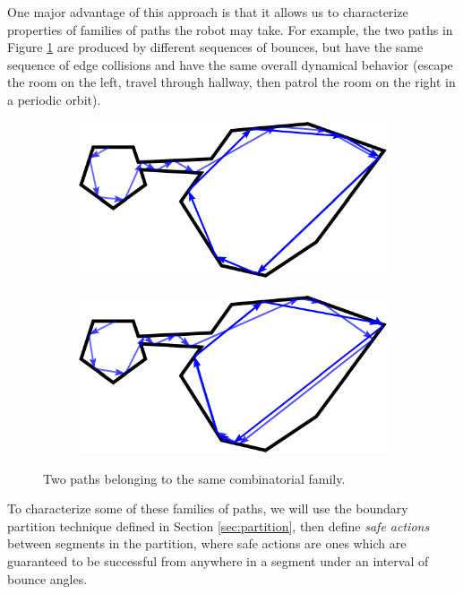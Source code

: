 \documentclass[]{styles/svproc}  %
\begin{document}
One major advantage of this approach is that it allows us to characterize
properties of families of paths the robot may take. For example, the  
two paths in Figure \ref{fig:twopaths} are produced by different sequences of
bounces, but have the same sequence of edge collisions and have the same overall
dynamical behavior (escape the room on the left, travel through hallway, then
patrol the room on the right in a periodic orbit).

\begin{figure}
\centering
\begin{subfigure}{0.5\textwidth}
\includegraphics[width=\linewidth]{figures/twoc_a}
\end{subfigure}%
\begin{subfigure}{0.5\textwidth}
\includegraphics[width=\linewidth]{figures/twoc_b}
\end{subfigure}
\caption{Two paths belonging to the same combinatorial family.}
\label{fig:twopaths}
\end{figure}

To characterize some of these families of paths, we will use the boundary
partition technique defined in Section \ref{sec:partition}, then define
\emph{safe actions} between segments in the partition, where safe actions are
ones which are guaranteed to be successful from anywhere in a segment under an
interval of bounce angles.
\end{document}

